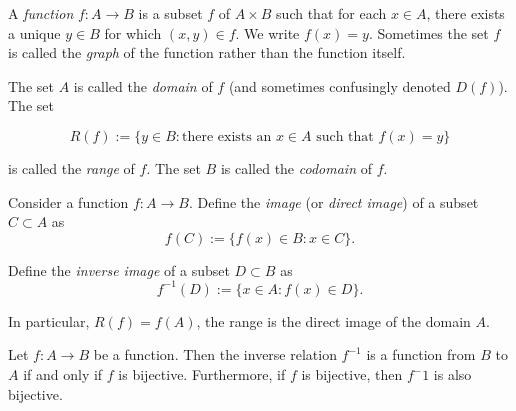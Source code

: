 \documentclass[../main.tex]{subfiles}
\begin{document}
\begin{definition} \label{def:function}
A \textit{function} \( f: A \to B \) is a subset \( f \) of \( A \times B \) such that for each \( x \in A \),
there exists a unique \( y \in B \) for which \( (x, y) \in f \). We write \( f(x) = y \). Sometimes the set \( f \) is
called the \textit{graph} of the function rather than the function itself.

The set \( A \) is called the \textit{domain} of \( f \) (and sometimes confusingly denoted \( D(f) \)). The set

\[
R(f) := \{y \in B : \text{there exists an } x \in A \text{ such that } f(x) = y\}
\]

is called the \textit{range} of \( f \). The set \( B \) is called the \textit{codomain} of \( f \).
\end{definition}















\begin{definition} \label{def:image_inverse_image}
Consider a function \( f: A \to B \). Define the \textit{image} (or \textit{direct image}) of a subset \( C \subset A \) as
\[
f(C) := \{ f(x) \in B : x \in C \}.
\]

Define the \textit{inverse image} of a subset \( D \subset B \) as
\[
f^{-1}(D) := \{ x \in A : f(x) \in D \}.
\]

In particular, \( R(f) = f(A) \), the range is the direct image of the domain \( A \).
\end{definition}



\begin{theorem}
Let $f:A \to B$ be a function. Then the inverse relation $f^{-1}$ is a function from $B$ to $A$ if and only if $f$ is bijective. Furthermore, if $f$ is bijective, then $f^-1$ is also bijective. 
\end{theorem}
\end{document}

